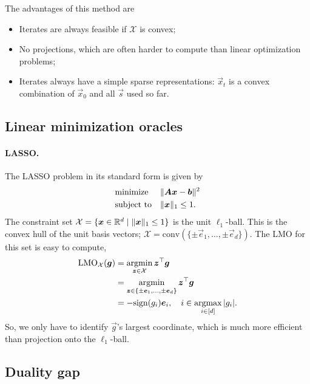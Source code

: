 The advantages of this method are
\begin{itemize}
    \item Iterates are always feasible if $\mathcal{X}$ is convex;
    \item No projections, which are often harder to compute than linear optimization problems;
    \item Iterates always have a simple sparse representations: $\vec{x}_t$ is a convex combination of
          $\vec{x}_0$ and all $\vec{s}$ used so far.
\end{itemize}

\subsection{Linear minimization oracles}

\paragraph{LASSO.}

The LASSO problem in its standard form is given by \[
    \begin{aligned}
         & \text{minimize}   &  & \| \bm{A} \bm{x} - \bm{b} \|^2 \\
         & \text{subject to} &  & \| \bm{x} \|_1 \leq 1.
    \end{aligned}
\]
The constraint set $\mathcal{X} = \{ \bm{x} \in \mathbb{R}^d \mid \| \bm{x} \|_1 \leq 1 \}$ is the unit
$\ell_1$-ball. This is the convex hull of the unit basis vectors; $\mathcal{X} = \mathrm{conv}(\{
    \pm \vec{e}_1, \ldots, \pm \vec{e}_d \})$. The LMO for this set is easy to compute,
\begin{align*}
    \mathrm{LMO}_{\mathcal{X}}(\bm{g}) & = \operatorname*{argmin}_{\bm{z}\in \mathcal{X}} \bm{z}^\top \bm{g}                                 \\
                                        & = \operatorname*{argmin}_{\bm{z} \in \{ \pm \bm{e}_1, \ldots, \pm \bm{e}_d \}} \bm{z}^\top \bm{g} \\
                                        & = -\mathrm{sign}(g_i) \bm{e}_i, \quad i \in \operatorname*{argmax}_{i \in [d]} |g_i|.
\end{align*}
So, we only have to identify $\vec{g}$'s largest coordinate, which is much more efficient than
projection onto the $\ell_1$-ball.

\subsection{Duality gap}

